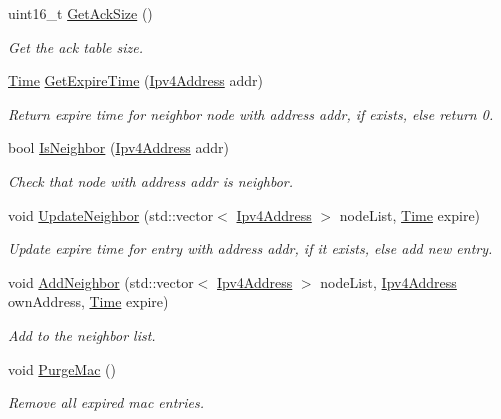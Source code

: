 \begin{DoxyCompactItemize}
uint16\+\_\+t \hyperlink{classns3_1_1dsr_1_1DsrRouteCache_a5aedc12debf59f97bb1de1c4fe2f7987}{Get\+Ack\+Size} ()
\begin{DoxyCompactList}\small\item\em Get the ack table size. \end{DoxyCompactList}\item 
\hyperlink{classns3_1_1Time}{Time} \hyperlink{classns3_1_1dsr_1_1DsrRouteCache_aa9a8137b8eb12cdc8961fb1c51b0a3f4}{Get\+Expire\+Time} (\hyperlink{classns3_1_1Ipv4Address}{Ipv4\+Address} addr)
\begin{DoxyCompactList}\small\item\em Return expire time for neighbor node with address addr, if exists, else return 0. \end{DoxyCompactList}\item 
bool \hyperlink{classns3_1_1dsr_1_1DsrRouteCache_aef8f383fea545e8836c932909d9feaac}{Is\+Neighbor} (\hyperlink{classns3_1_1Ipv4Address}{Ipv4\+Address} addr)
\begin{DoxyCompactList}\small\item\em Check that node with address addr is neighbor. \end{DoxyCompactList}\item 
void \hyperlink{classns3_1_1dsr_1_1DsrRouteCache_acfa1d1263cce66806fa910f6a3de342a}{Update\+Neighbor} (std\+::vector$<$ \hyperlink{classns3_1_1Ipv4Address}{Ipv4\+Address} $>$ node\+List, \hyperlink{classns3_1_1Time}{Time} expire)
\begin{DoxyCompactList}\small\item\em Update expire time for entry with address addr, if it exists, else add new entry. \end{DoxyCompactList}\item 
void \hyperlink{classns3_1_1dsr_1_1DsrRouteCache_aff6d75f7d80d35771b811c16a98af867}{Add\+Neighbor} (std\+::vector$<$ \hyperlink{classns3_1_1Ipv4Address}{Ipv4\+Address} $>$ node\+List, \hyperlink{classns3_1_1Ipv4Address}{Ipv4\+Address} own\+Address, \hyperlink{classns3_1_1Time}{Time} expire)
\begin{DoxyCompactList}\small\item\em Add to the neighbor list. \end{DoxyCompactList}\item 
void \hyperlink{classns3_1_1dsr_1_1DsrRouteCache_a8067511b3243452bd0af4c892d093168}{Purge\+Mac} ()
\begin{DoxyCompactList}\small\item\em Remove all expired mac entries. \end{DoxyCompactList}\item 

\end{DoxyCompactItemize}
